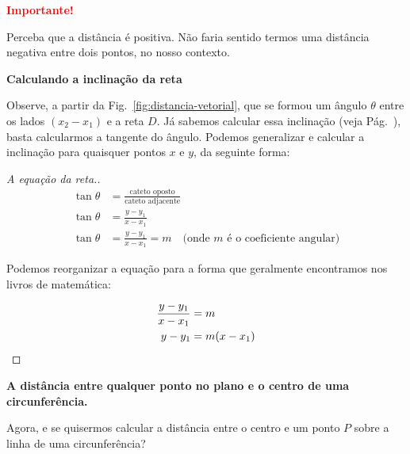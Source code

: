 \documentclass[12pt,openright,twoside,a4paper]{article}
\theoremstyle{definition}
\begin{document}
	\begin{snugshade}
		\textbf{\textcolor{red}{Importante!}}
	
		Perceba que a distância é positiva. Não faria sentido termos uma distância negativa entre dois pontos, no nosso contexto.
	\end{snugshade}
	
	\textbf{Calculando a inclinação da reta}
	
	Observe, a partir da Fig.~\ref{fig:distancia-vetorial}, que se formou um ângulo $\theta$ entre os lados $(x_2 - x_1)$ e a reta $D$. Já sabemos calcular essa inclinação (veja Pág.~\pageref{tema:coef_angular}), basta calcularmos a tangente do ângulo. Podemos generalizar e calcular a inclinação para quaisquer pontos $x$ e $y$, da seguinte forma:
	
	\begin{proof}[A equação da reta.]
		\begin{align*}
			\tan{\theta} &= \frac{\text{cateto oposto}}{\text{cateto adjacente}}\\
			\tan{\theta} &= \frac{y - y_1}{x - x_1}\\
			\tan{\theta} &= \frac{y - y_1}{x - x_1}=m \quad \text{(onde $m$ é o coeficiente angular)}
		\end{align*}
		
		Podemos reorganizar a equação para a forma que geralmente encontramos nos livros de matemática:
		
		\begin{align*}
			\frac{y - y_1}{x - x_1} &= m\\
			y - y_1 &= m(x - x_1) \qedhere
		\end{align*}
	\end{proof}
	
	\textbf{A distância entre qualquer ponto no plano e o centro de uma circunferência.}
	
	Agora, e se quisermos calcular a distância entre o centro e um ponto $P$ sobre a linha de uma circunferência?
	
\end{document}
